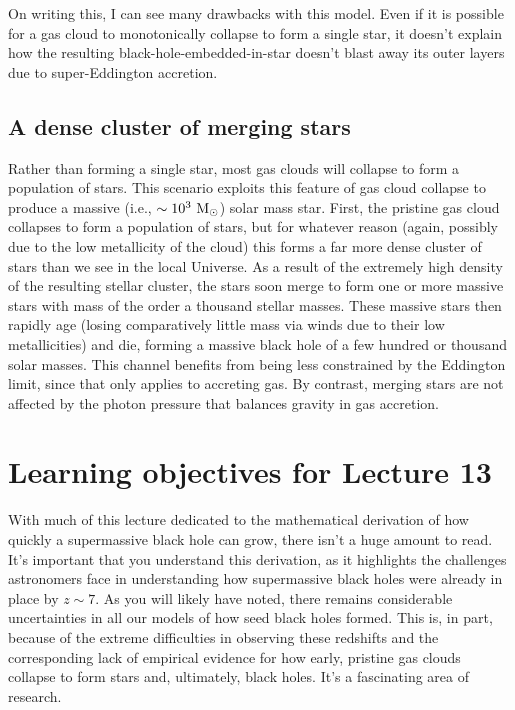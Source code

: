 \documentclass[11pt]{article}
\begin{document}
On writing this, I can see many drawbacks with this model. Even if it
is possible for a gas cloud to monotonically collapse to form a single
star, it doesn't explain how the resulting black-hole-embedded-in-star
doesn't blast away its outer layers due to super-Eddington accretion.

\subsection{A dense cluster of merging stars}
Rather than forming a single star, most gas clouds will collapse to
form a population of stars. This scenario exploits this feature of gas
cloud collapse to produce a massive (i.e., $\sim10^3~{\rm M_\odot}$)
solar mass star. First, the pristine gas cloud collapses to form a
population of stars, but for whatever reason (again, possibly due to
the low metallicity of the cloud) this forms a far more dense cluster
of stars than we see in the local Universe. As a result of the
extremely high density of the resulting stellar cluster, the stars
soon merge to form one or more massive stars with mass of the order a
thousand stellar masses. These massive stars then rapidly age (losing
comparatively little mass via winds due to their low metallicities)
and die, forming a massive black hole of a few hundred or thousand
solar masses. This channel benefits from being less constrained by the
Eddington limit, since that only applies to accreting gas. By
contrast, merging stars are not affected by the photon pressure that
balances gravity in gas accretion.

\section{Learning objectives for Lecture 13}
With much of this lecture dedicated to the mathematical derivation of
how quickly a supermassive black hole can grow, there isn't a huge
amount to read. It's important that you understand this derivation, as
it highlights the challenges astronomers face in understanding how
supermassive black holes were already in place by $z\sim7$. As you
will likely have noted, there remains considerable uncertainties in
all our models of how seed black holes formed. This is, in part,
because of the extreme difficulties in observing these redshifts and
the corresponding lack of empirical evidence for how early, pristine gas
clouds collapse to form stars and, ultimately, black holes. It's a
fascinating area of research. 
\end{document}
